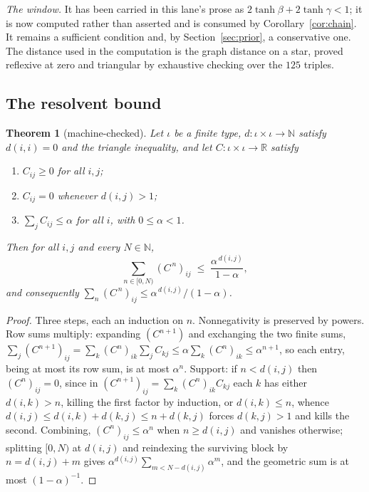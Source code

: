 \documentclass[11pt]{article}
\newtheorem{theorem}{Theorem}[section]
\theoremstyle{definition}
\newcommand{\R}{\mathbb{R}}
\newcommand{\N}{\mathbb{N}}
\begin{document}
\emph{The window.}  It has been carried in this lane's prose as
$2\tanh\beta+2\tanh\gamma<1$; it is now computed rather than asserted and is
consumed by Corollary~\ref{cor:chain}.  It remains a sufficient condition and,
by Section~\ref{sec:prior}, a conservative one.  The distance used in the
computation is the graph distance on a star, proved reflexive at zero and
triangular by exhaustive checking over the $125$ triples.

\subsection{The resolvent bound}

\begin{theorem}[machine-checked]
\label{thm:d1}
Let $\iota$ be a finite type, $d:\iota\times\iota\to\N$ satisfy $d(i,i)=0$ and
the triangle inequality, and let $C:\iota\times\iota\to\R$ satisfy
\begin{enumerate}
\item[(i)] $C_{ij}\ge0$ for all $i,j$;
\item[(ii)] $C_{ij}=0$ whenever $d(i,j)>1$;
\item[(iii)] $\sum_j C_{ij}\le\alpha$ for all $i$, with $0\le\alpha<1$.
\end{enumerate}
Then for all $i,j$ and every $N\in\N$,
\[
  \sum_{n\in[0,N)}(C^{\,n})_{ij}\;\le\;\frac{\alpha^{\,d(i,j)}}{1-\alpha},
\]
and consequently $\sum_{n}(C^{\,n})_{ij}\le\alpha^{\,d(i,j)}/(1-\alpha)$.
\end{theorem}

\begin{proof}
Three steps, each an induction on $n$.  Nonnegativity is preserved by powers.
Row sums multiply: expanding $(C^{n+1})$ and exchanging the two finite sums,
$\sum_j(C^{n+1})_{ij}=\sum_k(C^{n})_{ik}\sum_jC_{kj}\le\alpha\sum_k(C^{n})_{ik}
\le\alpha^{n+1}$, so each entry, being at most its row sum, is at most
$\alpha^{n}$.  Support: if $n<d(i,j)$ then $(C^{n})_{ij}=0$, since in
$(C^{n+1})_{ij}=\sum_k(C^{n})_{ik}C_{kj}$ each $k$ has either $d(i,k)>n$, killing
the first factor by induction, or $d(i,k)\le n$, whence
$d(i,j)\le d(i,k)+d(k,j)\le n+d(k,j)$ forces $d(k,j)>1$ and kills the second.
Combining, $(C^{n})_{ij}\le\alpha^{n}$ when $n\ge d(i,j)$ and vanishes otherwise;
splitting $[0,N)$ at $d(i,j)$ and reindexing the surviving block by
$n=d(i,j)+m$ gives $\alpha^{d(i,j)}\sum_{m<N-d(i,j)}\alpha^{m}$, and the
geometric sum is at most $(1-\alpha)^{-1}$.
\end{proof}
\end{document}
